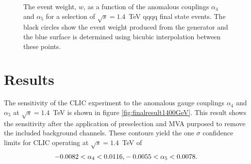 \begin{figure}[h!]
\caption[The event weight, $w$, as a function of the anomalous couplings $\alpha_{4}$ and $\alpha_{5}$ for a selection of $\sqrt{s}=1.4$~TeV \nu{\nu}qqqq final state events.  The black circles show the event weight produced from the generator and the blue surface is determined using bicubic interpolation between these points.]{The event weight, $w$, as a function of the anomalous couplings $\alpha_{4}$ and $\alpha_{5}$ for a selection of $\sqrt{s}=1.4$~TeV \nu{\nu}qqqq final state events.  The black circles show the event weight produced from the generator and the blue surface is determined using bicubic interpolation between these points.}
\label{fig:eventweights1400interpolated}
\end{figure}


\section{Results}
The sensitivity of the CLIC experiment to the anomalous gauge couplings $\alpha_{4}$ and $\alpha_{5}$ at $\sqrt{s}=1.4$~TeV is shown in figure \ref{fig:finalresult1400GeV}.  This result shows the sensitivity after the application of preselection and MVA purposed to remove the included background channels.  These contours yield the one $\sigma$ confidence limits for CLIC operating at $\sqrt{s}=1.4$~TeV of
%
\begin{equation}
-0.0082 < \alpha_{4} < 0.0116 \text{,} \\
-0.0055 < \alpha_{5} < 0.0078 \text{.}
\end{equation}
%

